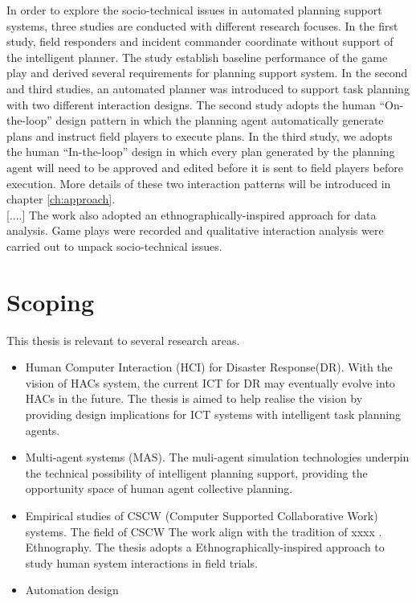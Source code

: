 In order to explore the socio-technical issues in automated planning support systems, three studies are conducted with different research focuses. In the first study, field responders and incident commander coordinate without support of the intelligent planner. The study establish baseline performance of the game play and derived several requirements for planning support system. In the second and third studies, an automated planner was introduced to support task planning with two different interaction designs. The second study adopts the human ``On-the-loop'' design pattern in which the planning agent automatically generate plans and instruct field players to execute plans. In the third study, we adopts the human ``In-the-loop'' design in which every plan generated by the planning agent will need to be approved and edited before it is sent to field players before execution. More details of these two interaction patterns will be introduced in chapter \ref{ch:approach}.\\

[....] The work also adopted an ethnographically-inspired approach for data analysis. Game plays were recorded and qualitative interaction analysis were carried out to unpack socio-technical issues.\\


\section{Scoping}\label{sec:custom}

This thesis is relevant to several research areas. \\

\begin{itemize} 
  \item Human Computer Interaction (HCI) for Disaster Response(DR). With the vision of HACs system, the current ICT for DR may eventually evolve into HACs in the future. The thesis is aimed to help realise the vision by providing design implications for ICT systems with intelligent task planning agents. 
  \item Multi-agent systems (MAS). The muli-agent simulation technologies underpin the technical possibility of intelligent planning support, providing the opportunity space of human agent collective planning. 
  \item Empirical studies of CSCW (Computer Supported Collaborative Work) systems. The field of CSCW  The work align with the tradition of xxxx . Ethnography. The thesis adopts a Ethnographically-inspired approach to study human system interactions in field trials.
  \item Automation design 
\end{itemize}

